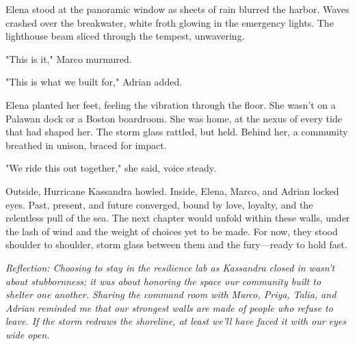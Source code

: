 Elena stood at the panoramic window as sheets of rain blurred the harbor. Waves crashed over the breakwater, white froth glowing in the emergency lights. The lighthouse beam sliced through the tempest, unwavering.

"This is it," Marco murmured.

"This is what we built for," Adrian added.

Elena planted her feet, feeling the vibration through the floor. She wasn't on a Palawan dock or a Boston boardroom. She was home, at the nexus of every tide that had shaped her. The storm glass rattled, but held. Behind her, a community breathed in unison, braced for impact.

"We ride this out together," she said, voice steady.

Outside, Hurricane Kassandra howled. Inside, Elena, Marco, and Adrian locked eyes. Past, present, and future converged, bound by love, loyalty, and the relentless pull of the sea. The next chapter would unfold within these walls, under the lash of wind and the weight of choices yet to be made. For now, they stood shoulder to shoulder, storm glass between them and the fury—ready to hold fast.


\noindent\textit{Reflection: Choosing to stay in the resilience lab as Kassandra closed in wasn't about stubbornness; it was about honoring the space our community built to shelter one another. Sharing the command room with Marco, Priya, Talia, and Adrian reminded me that our strongest walls are made of people who refuse to leave. If the storm redraws the shoreline, at least we'll have faced it with our eyes wide open.}
